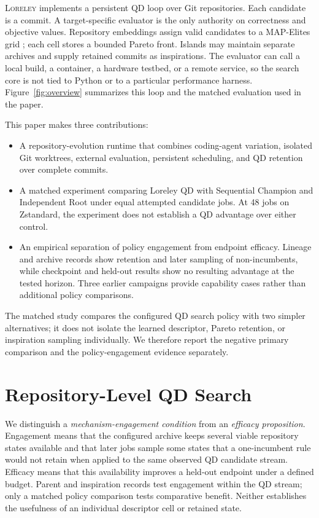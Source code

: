 \documentclass[10pt,twocolumn]{article}
\newcommand{\system}{\textsc{Loreley}\xspace}
\begin{document}
\system implements a persistent QD loop over Git repositories. Each candidate
is a commit. A target-specific evaluator is the only authority on correctness
and objective values. Repository embeddings assign valid candidates to a
MAP-Elites grid \citep{mouret2015mapelites}; each cell stores a bounded Pareto
front. Islands may maintain separate archives and supply retained commits as
inspirations. The evaluator can call a local build, a container, a hardware
testbed, or a remote service, so the search core is not tied to Python or to a
particular performance harness. Figure~\ref{fig:overview} summarizes this loop
and the matched evaluation used in the paper.

This paper makes three contributions:

\begin{itemize}
  \item A repository-evolution runtime that combines coding-agent variation,
  isolated Git worktrees, external evaluation, persistent scheduling, and QD
  retention over complete commits.
  \item A matched experiment comparing Loreley QD with Sequential Champion and
  Independent Root under equal attempted candidate jobs. At 48 jobs on
  Zstandard, the experiment does not establish a QD advantage over either
  control.
  \item An empirical separation of policy engagement from endpoint efficacy.
  Lineage and archive records show retention and later sampling of
  non-incumbents, while checkpoint and held-out results show no resulting
  advantage at the tested horizon. Three earlier campaigns provide capability
  cases rather than additional policy comparisons.
\end{itemize}

The matched study compares the configured QD search policy with two simpler
alternatives; it does not isolate the learned descriptor, Pareto retention, or
inspiration sampling individually. We therefore report the negative primary
comparison and the policy-engagement evidence separately.

\section{Repository-Level QD Search}
\label{sec:problem}

We distinguish a \emph{mechanism-engagement condition} from an \emph{efficacy
proposition}. Engagement means that the configured archive keeps several viable
repository states available and that later jobs sample some states that a
one-incumbent rule would not retain when applied to the same observed QD
candidate stream. Efficacy means that this availability improves a held-out
endpoint under a defined budget. Parent and inspiration records test
engagement within the QD stream; only a matched policy comparison tests
comparative benefit. Neither establishes the usefulness of an individual
descriptor cell or retained state.
\end{document}
